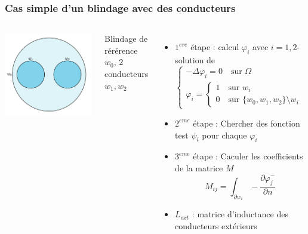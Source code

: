 \begin{frame}
\frametitle{Cas simple d'un blindage avec des conducteurs}
\begin{columns}[T]
\begin{center}
\includegraphics[scale=0.2]{figures/figures/f3}
\end{center}
Blindage de r\'er\'erence $w_0$, $2$ conducteurs $w_1, w_2$
\begin{itemize}
\item $1^{ere}$ \'etape : calcul $\varphi_i$ avec $i=1,2$-solution de
 \begin{equation}
 \begin{cases}
 -\Delta\varphi_i = 0 \quad \text{sur } \Omega \\
 \varphi_i =  
 \begin{cases}
 1 \quad \text{sur } w_i \\
 0 \quad \text{sur } \{w_0,w_1,w_2 \} \setminus w_i
 \end{cases}
 \end{cases}
 \end{equation}
\item $2^{eme}$ \'etape : Chercher des fonction test $\psi_i$ pour chaque $\varphi_i$
\item $3^{eme}$ \'etape : Caculer les coefficients de la matrice $M$
\begin{equation}
    M_{ij} = \int_{\partial w_i} -\frac{\partial \varphi^{-}_j}{\partial n}
\end{equation}
\item $L_{ext}$ : matrice d'inductance des conducteurs ext\'erieurs  
\end{itemize}
\end{columns}
\end{frame} 

